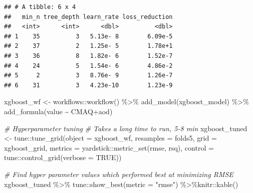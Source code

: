\documentclass[
]{article}
\newenvironment{Shaded}{\begin{snugshade}}{\end{snugshade}}
\newcommand{\AttributeTok}[1]{\textcolor[rgb]{0.77,0.63,0.00}{#1}}
\newcommand{\CommentTok}[1]{\textcolor[rgb]{0.56,0.35,0.01}{\textit{#1}}}
\newcommand{\ConstantTok}[1]{\textcolor[rgb]{0.00,0.00,0.00}{#1}}
\newcommand{\FunctionTok}[1]{\textcolor[rgb]{0.00,0.00,0.00}{#1}}
\newcommand{\NormalTok}[1]{#1}
\newcommand{\OtherTok}[1]{\textcolor[rgb]{0.56,0.35,0.01}{#1}}
\newcommand{\SpecialCharTok}[1]{\textcolor[rgb]{0.00,0.00,0.00}{#1}}
\newcommand{\StringTok}[1]{\textcolor[rgb]{0.31,0.60,0.02}{#1}}
\begin{document}
\begin{verbatim}
## # A tibble: 6 x 4
##   min_n tree_depth learn_rate loss_reduction
##   <int>      <int>      <dbl>          <dbl>
## 1    35          3   5.13e- 8        6.09e-5
## 2    37          2   1.25e- 5        1.78e+1
## 3    36          8   1.82e- 6        1.52e-7
## 4    24          5   1.54e- 6        4.86e-2
## 5     2          3   8.76e- 9        1.26e-7
## 6    31          3   4.23e-10        1.23e-9
\end{verbatim}

\begin{Shaded}
\begin{Highlighting}[]
\NormalTok{xgboost\_wf }\OtherTok{\textless{}{-}}\NormalTok{ workflows}\SpecialCharTok{::}\FunctionTok{workflow}\NormalTok{() }\SpecialCharTok{\%\textgreater{}\%}
  \FunctionTok{add\_model}\NormalTok{(xgboost\_model) }\SpecialCharTok{\%\textgreater{}\%} 
  \FunctionTok{add\_formula}\NormalTok{(value }\SpecialCharTok{\textasciitilde{}}\NormalTok{ CMAQ}\SpecialCharTok{+}\NormalTok{aod)}

\CommentTok{\# Hyperparameter tuning}
\CommentTok{\# Takes a long time to run, 5{-}8 min}
\NormalTok{xgboost\_tuned }\OtherTok{\textless{}{-}}\NormalTok{ tune}\SpecialCharTok{::}\FunctionTok{tune\_grid}\NormalTok{(}\AttributeTok{object =}\NormalTok{ xgboost\_wf, }\AttributeTok{resamples =}\NormalTok{ folds5,}
  \AttributeTok{grid =}\NormalTok{ xgboost\_grid, }\AttributeTok{metrics =}\NormalTok{ yardstick}\SpecialCharTok{::}\FunctionTok{metric\_set}\NormalTok{(rmse, rsq),}
  \AttributeTok{control =}\NormalTok{ tune}\SpecialCharTok{::}\FunctionTok{control\_grid}\NormalTok{(}\AttributeTok{verbose =} \ConstantTok{TRUE}\NormalTok{))}

\CommentTok{\# Find hyper parameter values which performed best at minimizing RMSE}
\NormalTok{xgboost\_tuned }\SpecialCharTok{\%\textgreater{}\%}\NormalTok{ tune}\SpecialCharTok{::}\FunctionTok{show\_best}\NormalTok{(}\AttributeTok{metric =} \StringTok{"rmse"}\NormalTok{) }\SpecialCharTok{\%\textgreater{}\%}\NormalTok{knitr}\SpecialCharTok{::}\FunctionTok{kable}\NormalTok{()}
\end{Highlighting}
\end{Shaded}
\end{document}
